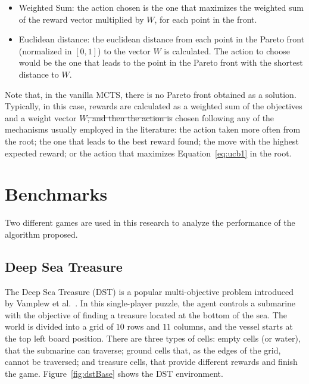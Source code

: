 \documentclass[journal]{IEEEtran}
\providecommand{\DIFaddtex}[1]{{\protect\color{blue}\uwave{#1}}} %
\providecommand{\DIFdeltex}[1]{{\protect\color{red}\sout{#1}}}                      %
\providecommand{\DIFaddbegin}{} %
\providecommand{\DIFaddend}{} %
\providecommand{\DIFdelbegin}{} %
\providecommand{\DIFdelend}{} %
\providecommand{\DIFadd}[1]{\texorpdfstring{\DIFaddtex{#1}}{#1}} %
\providecommand{\DIFdel}[1]{\texorpdfstring{\DIFdeltex{#1}}{}} %
\begin{document}
\begin{itemize}
\item Weighted Sum: the action chosen is the one that maximizes the weighted sum of the reward vector multiplied by $W$, for each point in the front.
\item Euclidean distance: the euclidean distance from each point in the Pareto front (normalized in $[0,1]$) to the vector $W$ is calculated. The action to choose would be the one that leads to the point in the Pareto front with the shortest distance to $W$. 
\end{itemize}

Note that, in the vanilla MCTS, there is no Pareto front obtained as a solution. Typically, in this case, rewards are calculated as a weighted sum of the objectives and a weight vector $W$\DIFdelbegin \DIFdel{, and then the action is }\DIFdelend \DIFaddbegin \DIFadd{. The action is then }\DIFaddend chosen following any of the mechanisms usually employed in the literature: the action taken more often from the root; the one that leads to the best reward found; the move with the highest expected reward; or the action that maximizes Equation~\ref{eq:ucb1} in the root.

\section{Benchmarks} \label{sec:bench}

Two different games are used in this research to analyze the performance of the algorithm proposed.

\subsection{Deep Sea Treasure} \label{ssec:dst}

The Deep Sea Treasure (DST) is a popular multi-objective problem introduced by Vamplew et al.~\cite{Vamplew2010}. In this single-player puzzle, the agent controls a submarine with the objective of finding a treasure located at the bottom of the sea. The world is divided into a grid of $10$ rows and $11$ columns, and the vessel starts at the top left board position. There are three types of cells: empty cells (or water), that the submarine can traverse; ground cells that, as the edges of the grid, cannot be traversed; and treasure cells, that provide different rewards and finish the game. Figure~\ref{fig:dstBase} shows the DST environment.
\end{document}
